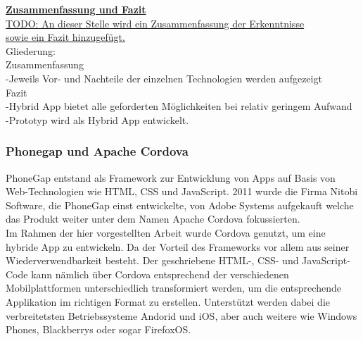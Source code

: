\textbf{\underline{Zusammenfassung und Fazit}}\\





\underline{TODO: An dieser Stelle wird ein Zusammenfassung der Erkenntnisse }\\
\underline{sowie ein Fazit hinzugefügt.}
\\Gliederung:
\\Zusammenfassung
\\-Jeweils Vor- und Nachteile der einzelnen Technologien werden aufgezeigt
\\Fazit
\\-Hybrid App bietet alle geforderten Möglichkeiten bei relativ geringem Aufwand
\\-Prototyp wird als Hybrid App entwickelt.






\subsubsection{Phonegap und Apache Cordova}
PhoneGap entstand als Framework zur Entwicklung von Apps auf Basis von Web-Technologien wie HTML, CSS und JavaScript. 2011 wurde die Firma Nitobi Software, die PhoneGap einst entwickelte, von Adobe Systems aufgekauft welche das Produkt weiter unter dem Namen Apache Cordova fokussierten. 
\\
Im Rahmen der hier vorgestellten Arbeit wurde Cordova genutzt, um eine hybride App zu entwickeln. Da der Vorteil des Frameworks vor allem aus seiner Wiederverwendbarkeit besteht. Der geschriebene HTML-, CSS- und JavaScript-Code kann nämlich über Cordova entsprechend der verschiedenen Mobilplattformen unterschiedlich transformiert werden, um die entsprechende Applikation im richtigen Format zu erstellen. Unterstützt werden dabei die verbreitetsten Betriebssysteme Andorid und iOS, aber auch weitere wie Windows Phones, Blackberrys oder sogar FirefoxOS.


